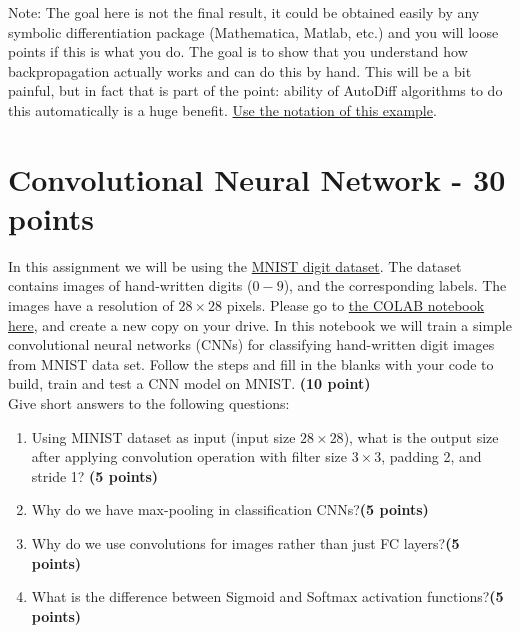 \documentclass[12pt]{article}
\begin{document}
Note: The goal here is not the final result, it could be obtained easily by any symbolic differentiation
package (Mathematica, Matlab, etc.) and you will loose points if this is what you do. The goal is to show
that you understand how backpropagation actually works and can do this by hand. This will be a bit painful,
but in fact that is part of the point: ability of AutoDiff algorithms to do this automatically is a huge benefit.  \href{https://canvas.ubc.ca/files/13305822/download?download_frd=1}{Use the notation of this example}.

\section{Convolutional Neural Network - 30 points}
In this assignment we will be using the \href{https://www.tensorflow.org/datasets/catalog/mnist}{MNIST digit dataset}. The dataset contains images of hand-written digits ($0-9$), and the corresponding labels. The images have a resolution of $28\times 28$ pixels.
Please go to \href{https://colab.research.google.com/drive/15QluTY841KoWqVh1CQ3lM6gKrtJvdRGC#scrollTo=_ut4_8RNi1oU}{the COLAB notebook here}, and create a new copy on your drive. In this notebook we will train a simple convolutional neural networks (CNNs) for classifying hand-written digit images from MNIST data set. Follow the steps and fill in the blanks with your code to build, train and test a CNN model on MNIST. \textbf{(10 point)}\\ \newline
\noindent Give short answers to the following questions:

\begin{enumerate}[label=(\roman*)]
\item Using MINIST dataset as input (input size $28 \times 28$), what is the output size after applying convolution operation with filter size $3\times3$, padding 2, and stride 1? \textbf{(5 points)}
\item Why do we have max-pooling in classification CNNs?\textbf{(5 points)}
\item  Why do we use convolutions for images rather than
just FC layers?\textbf{(5 points)}
\item What is the difference between Sigmoid and Softmax activation functions?\textbf{(5 points)}
\end{enumerate}
\end{document}
